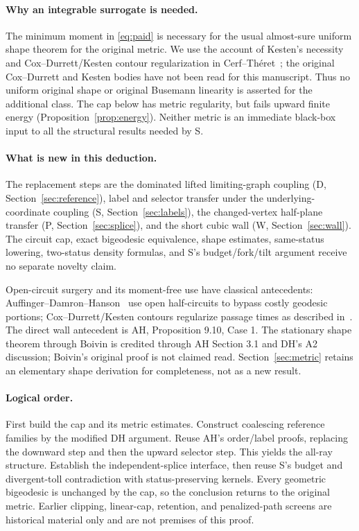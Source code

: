 \paragraph{Why an integrable surrogate is needed.}
The minimum moment in \eqref{eq:paid} is necessary for the usual almost-sure
uniform shape theorem for the original metric. We use the account of
Kesten's necessity and Cox--Durrett/Kesten contour regularization in
Cerf--Th\'eret~\cite[Section 1.2]{CT}; the original Cox--Durrett and Kesten
bodies have not been read for this manuscript. Thus no uniform original
shape or original Busemann linearity is asserted for the additional class.
The cap below has metric regularity, but fails upward finite energy
(Proposition~\ref{prop:energy}). Neither metric is an immediate black-box
input to all the structural results needed by S.

\paragraph{What is new in this deduction.}
The replacement steps are the dominated lifted limiting-graph coupling
(D, Section~\ref{sec:reference}), label and selector transfer under the
underlying-coordinate coupling (S, Section~\ref{sec:labels}), the changed-vertex
half-plane transfer (P, Section~\ref{sec:splice}), and the short cubic wall
(W, Section~\ref{sec:wall}). The circuit cap, exact bigeodesic equivalence,
shape estimates, same-status lowering, two-status density formulas, and S's
budget/fork/tilt argument receive no separate novelty claim.

Open-circuit surgery and its moment-free use have classical antecedents:
Auffinger--Damron--Hanson~\cite[Appendix C, Lemma C.5 and (26)]{ADH} use
open half-circuits to bypass costly geodesic portions; Cox--Durrett/Kesten
contours regularize passage times as described in~\cite{CT}. The direct
wall antecedent is AH, Proposition 9.10, Case 1. The stationary shape theorem
through Boivin is credited through AH Section 3.1 and DH's A2 discussion;
Boivin's original proof is not claimed read. Section~\ref{sec:metric}
retains an elementary shape derivation for completeness, not as a new result.

\paragraph{Logical order.}
First build the cap and its metric estimates. Construct coalescing reference
families by the modified DH argument. Reuse AH's order/label proofs, replacing
the downward step and then the upward selector step. This yields the all-ray
structure. Establish the independent-splice interface, then reuse S's
budget and divergent-toll contradiction with status-preserving kernels.
Every geometric bigeodesic is unchanged by the cap, so the conclusion returns
to the original metric. Earlier clipping, linear-cap, retention, and penalized-path
screens are historical material only and are not premises of this proof.
